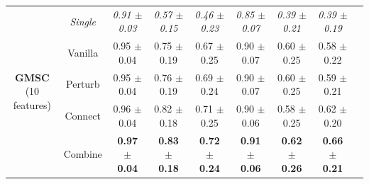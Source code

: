 \begin{table}[t]
\begin{tabular}{ccccccccc}
\multirow{5}{*}{\parbox{0.09\textwidth}{\centering\textbf{GMSC}\\ \scriptsize (10 features)}}
    & \textit{Single} & \textit{0.91 $\pm$ 0.03} & \textit{0.57 $\pm$ 0.15} & \textit{0.46 $\pm$ 0.23} & \textit{0.85 $\pm$ 0.07} & \textit{0.39 $\pm$ 0.21} & \textit{0.39 $\pm$ 0.19} \\
    & Vanilla & 0.95 $\pm$ 0.04 & 0.75 $\pm$ 0.19 & 0.67 $\pm$ 0.25 & 0.90 $\pm$ 0.07 & 0.60 $\pm$ 0.25 & 0.58 $\pm$ 0.22 \\
    & Perturb & 0.95 $\pm$ 0.04 & 0.76 $\pm$ 0.19 & 0.69 $\pm$ 0.24 & 0.90 $\pm$ 0.07 & 0.60 $\pm$ 0.25 & 0.59 $\pm$ 0.21 \\
    & Connect & 0.96 $\pm$ 0.04 & 0.82 $\pm$ 0.18 & 0.71 $\pm$ 0.25 & 0.90 $\pm$ 0.06 & 0.58 $\pm$ 0.25 & 0.62 $\pm$ 0.20 \\
    & Combine & \textbf{0.97 $\pm$ 0.04} & \textbf{0.83 $\pm$ 0.18} & \textbf{0.72 $\pm$ 0.24} & \textbf{0.91 $\pm$ 0.06} & \textbf{0.62 $\pm$ 0.26} & \textbf{0.66 $\pm$ 0.21} \\ \midrule
\end{tabular}
\end{table}





